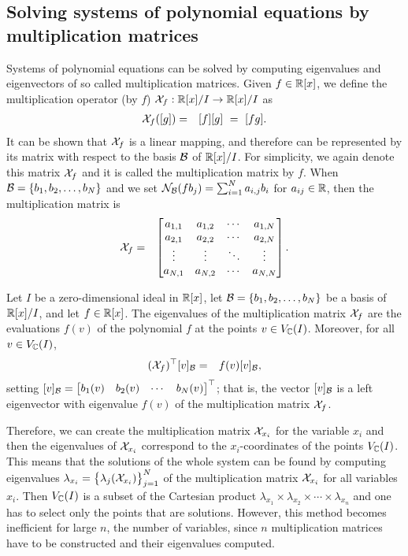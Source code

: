 \subsection{Solving systems of polynomial equations by multiplication matrices}
Systems of polynomial equations can be solved by computing eigenvalues and eigenvectors of so called multiplication matrices.
Given $f\in\mathbb{R}[x]$, we define the multiplication operator (by $f$) $\mathcal{X}_f: \mathbb{R}[x]/I \rightarrow \mathbb{R}[x]/I$ as
\begin{eqnarray}
  \mathcal{X}_f([g]) &=& [f][g]\ =\ [fg].
\end{eqnarray}
It can be shown that $\mathcal{X}_f$ is a linear mapping, and therefore can be represented by its matrix with respect to the basis $\mathcal{B}$ of $\mathbb{R}[x]/I$.
For simplicity, we again denote this matrix $\mathcal{X}_f$ and it is called the multiplication matrix by $f$.
When $\mathcal{B} = \{b_1, b_2, \ldots, b_N\}$ and we set $\mathcal{N}_{\mathcal{B}}(fb_j) = \sum_{i=1}^N a_{i,j}b_i$ for $a_{ij}\in\mathbb{R}$, then the multiplication matrix is
\begin{eqnarray}
  \mathcal{X}_f &=& \begin{bmatrix} a_{1,1} & a_{1,2} & \cdots & a_{1,N}\\
                 a_{2,1} & a_{2,2} & \cdots & a_{2,N}\\
                 \vdots & \vdots & \ddots & \vdots\\
                 a_{N,1} & a_{N,2} & \cdots & a_{N,N}\end{bmatrix}.
\end{eqnarray}

\begin{theorem}
  Let $I$ be a zero-dimensional ideal in $\mathbb{R}[x]$, let $\mathcal{B} = \{b_1, b_2, \dots, b_N\}$ be a basis of $\mathbb{R}[x]/I$, and let $f\in\mathbb{R}[x]$.
  The eigenvalues of the multiplication matrix $\mathcal{X}_f$ are the evaluations $f(v)$ of the polynomial $f$ at the points $v\in V_{\mathbb{C}}(I)$.
  Moreover, for all $v\in V_{\mathbb{C}}(I)$,
  \begin{eqnarray}
    (\mathcal{X}_f)^\top[v]_{\mathcal{B}} &=& f(v)[v]_{\mathcal{B}},
  \end{eqnarray}
  setting $[v]_{\mathcal{B}} = \begin{bmatrix} b_1(v) & b_2(v) & \cdots & b_N(v)\end{bmatrix}^\top$; that is, the vector $[v]_{\mathcal{B}}$ is a left eigenvector with eigenvalue $f(v)$ of the multiplication matrix $\mathcal{X}_f$.
\end{theorem}

Therefore, we can create the multiplication matrix $\mathcal{X}_{x_i}$ for the variable $x_i$ and then the eigenvalues of $\mathcal{X}_{x_i}$ correspond to the $x_i$-coordinates of the points $V_{\mathbb{C}}(I)$.
This means that the solutions of the whole system can be found by computing eigenvalues $\lambda_{x_i} = \big\{\lambda_j(\mathcal{X}_{x_i})\big\}_{j=1}^N$ of the multiplication matrix $\mathcal{X}_{x_i}$ for all variables $x_i$.
Then $V_{\mathbb{C}}(I)$ is a subset of the Cartesian product $\lambda_{x_1} \times \lambda_{x_2} \times \cdots \times \lambda_{x_n}$ and one has to select only the points that are solutions.
However, this method becomes inefficient for large $n$, the number of variables, since $n$ multiplication matrices have to be constructed and their eigenvalues computed.

